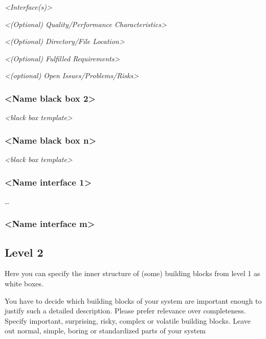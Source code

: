 \emph{\textless Interface(s)\textgreater{}}

\emph{\textless(Optional) Quality/Performance
Characteristics\textgreater{}}

\emph{\textless(Optional) Directory/File Location\textgreater{}}

\emph{\textless(Optional) Fulfilled Requirements\textgreater{}}

\emph{\textless(optional) Open Issues/Problems/Risks\textgreater{}}

\hypertarget{__name_black_box_2}{%
\subsubsection{\textless Name black box
2\textgreater{}}\label{__name_black_box_2}}

\emph{\textless black box template\textgreater{}}

\hypertarget{__name_black_box_n}{%
\subsubsection{\textless Name black box
n\textgreater{}}\label{__name_black_box_n}}

\emph{\textless black box template\textgreater{}}

\hypertarget{__name_interface_1}{%
\subsubsection{\textless Name interface
1\textgreater{}}\label{__name_interface_1}}

\ldots{}

\hypertarget{__name_interface_m}{%
\subsubsection{\textless Name interface
m\textgreater{}}\label{__name_interface_m}}

\hypertarget{_level_2}{%
\subsection{Level 2}\label{_level_2}}

Here you can specify the inner structure of (some) building blocks from
level 1 as white boxes.

You have to decide which building blocks of your system are important
enough to justify such a detailed description. Please prefer relevance
over completeness. Specify important, surprising, risky, complex or
volatile building blocks. Leave out normal, simple, boring or
standardized parts of your system

